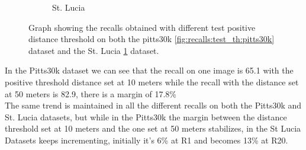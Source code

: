 \documentclass[10pt,twocolumn,letterpaper]{article}
\begin{document}
\begin{figure}[!h]
\begin{subfigure}[b]{0.23\textwidth}
		\caption{St. Lucia}
		\label{fig:recalls:test_th:st_lucia}
	\end{subfigure}
	\caption{Graph showing the recalls obtained with different test positive distance threshold on both the pitts30k \ref{fig:recalls:test_th:pitts30k} dataset and the St. Lucia \ref{fig:recalls:test_th:st_lucia} dataset.}
	\label{fig:recalls:test_th}
\end{figure}
In the Pitts30k dataset we can see that the recall on one image is 65.1 with the positive threshold distance set at 10 meters while the recall with the distance set at 50 meters is 82.9, there is a margin of 17.8\%\\
The same trend is maintained in all the different recalls on both the Pitts30k and St. Lucia datasets, but while in the Pitts30k the margin between the distance threshold set at 10 meters and the one set at 50 meters stabilizes, in the St Lucia Datasets keeps incrementing, initially it's 6\% at R1 and becomes 13\% at R20.
\end{document}
